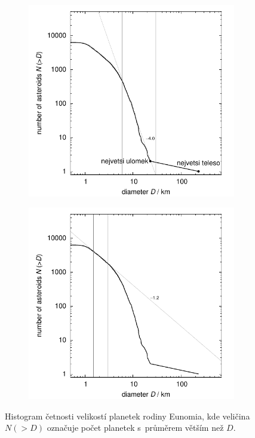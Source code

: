 \documentclass[A4paper, 12pt, oneside]{book}%
\begin{document}
\begin{figure}[!htb]
	\centering
	\begin{subfigure}[b]{0.45\textwidth}
	\includegraphics[width=\textwidth]{obr/size_distribution}
	\end{subfigure}
	\begin{subfigure}[b]{0.45\textwidth}
	\includegraphics[width=\textwidth]{obr/size_distribution_SMALLD}
	\end{subfigure}
	\caption{Histogram četnosti velikostí planetek rodiny Eunomia, kde veličina $N({>}D)$ označuje počet planetek s~průměrem větším než $D$.}
	\label{size_distribution}
\end{figure}
\end{document}
